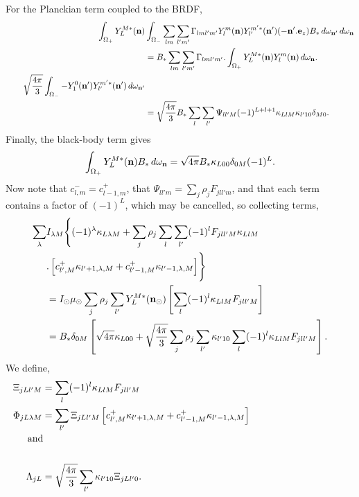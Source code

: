 For the Planckian term coupled to the BRDF,
{\small
\begin{equation}
\begin{split}
\int_{\Omega_+} Y_L^{M*} (\mathbf{n}) &\int_{\Omega_-} \sum_{lm} \sum_{l'm'}
\Gamma_{lml'm'} Y_l^m (\mathbf{n}) Y_{l'}^{m'*} (\mathbf{n}') (-\mathbf{n}'.\mathbf{e}_z)
B_* \, d\omega_{\mathbf{n}'} \, d\omega_{\mathbf{n}} \\
&= B_* \sum_{lm} \sum_{l'm'} \Gamma_{lml'm'} . \int_{\Omega_+} Y_L^{M*} (\mathbf{n})
Y_l^m (\mathbf{n})\, d\omega_{\mathbf{n}} . \\
\qquad \sqrt{4\pi\over 3} \int_{\Omega_-} - Y_1^0 (\mathbf{n}') 
Y_{l'}^{m'*} (\mathbf{n}') \, d\omega_{\mathbf{n}'} \\
&= \sqrt{4\pi\over 3} B_* \sum_l \sum_{l'} 
\Psi_{ll'M} (-1)^{L+l+1} \kappa_{LlM} \kappa_{l'10}
\delta_{M0}.
\end{split}
\end{equation}
}
Finally, the black-body term gives
\begin{equation}
\int_{\Omega_+} Y_L^{M*} (\mathbf{n}) B_* \, d\omega_{\mathbf{n}} 
= \sqrt{4\pi} B_* \kappa_{L00} \delta_{0M} (-1)^L.
\end{equation}
Now note that $c_{l,m}^- =c_{l-1,m}^+$, that
$\Psi_{ll'm}= \sum_j \rho_j F_{jll'm}$, and that each term contains a 
factor of $(-1)^L$, which may be cancelled, so collecting terms, 
{\small
\begin{equation}
\begin{split}
\sum_{\lambda} & I_{\lambda M} \Biggl \{ (-1)^\lambda \kappa_{L\lambda M}
+ \sum_j \rho_j \sum_l \sum_{l'} (-1)^l F_{jll'M} \kappa_{LlM} \\
&. \left [ c_{l',M}^+ \kappa_{l'+1,\lambda,M} 
+ c_{l'-1,M}^+ \kappa_{l'-1,\lambda,M} \right ] \Biggr \} \\
&= I_\odot \mu_\odot \sum_j \rho_j \sum_{l'} Y_L^{M*} (\mathbf{n}_\odot)
\left [ \sum_l (-1)^l \kappa_{LlM} F_{jll'M} \right ] \\
&= B_* \delta_{0M} \left [ \sqrt{4\pi} \kappa_{L00} 
+ \sqrt{4\pi\over 3} \sum_j \rho_j \sum_{l'}
\kappa_{l'10} \sum_l (-1)^l \kappa_{LlM} F_{jll'M} \right ].
\end{split}
\end{equation}
}
We define,
\begin{align}
\Xi_{jLl'M} &= \sum_l (-1)^l \kappa_{LlM} F_{jll'M} \\
\Phi_{jL\lambda M} &= \sum_{l'} \Xi_{jLl'M} \left [ 
c_{l',M}^+ \kappa_{l'+1,\lambda,M} +c_{l'-1,M}^+ \kappa_{l'-1,\lambda,M}
\right ] \\
\noalign{and} \\
\Lambda_{jL} &= \sqrt{4\pi\over 3} \sum_{l'} \kappa_{l'10} \Xi_{jLl'0}.
\end{align}
